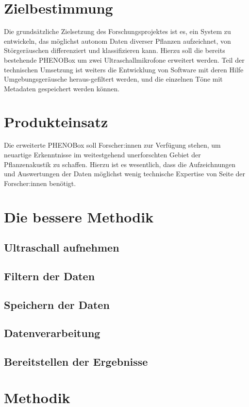 \documentclass[12pt]{article}
\begin{document}
\section{Zielbestimmung}
    Die grundsätzliche Zielsetzung des Forschungsprojektes ist es, ein System zu entwickeln, das möglichst autonom Daten diverser Pflanzen aufzeichnet, von Störgeräuschen differenziert und klassifizieren kann. Hierzu soll die bereits bestehende \Gls{PHENOBox} um zwei Ultraschallmikrofone erweitert werden. Teil der technischen Umsetzung ist weiters die Entwicklung von Software mit deren Hilfe Umgebungsgeräusche heraus-gefiltert werden, und die einzelnen Töne mit \Gls{Metadaten} gespeichert werden können.
\clearpage
    
\section{Produkteinsatz}
    Die erweiterte \Gls{PHENOBox} soll Forscher:innen zur Verfügung stehen, um neuartige Erkenntnisse im weitestgehend unerforschten Gebiet der Pflanzenakustik zu schaffen. Hierzu ist es wesentlich, dass die Aufzeichnungen und Auswertungen der Daten möglichst wenig technische Expertise von Seite der Forscher:innen benötigt. 
 \clearpage

\section{Die bessere Methodik}
    \subsection{Ultraschall aufnehmen} 
    \subsection{Filtern der Daten}
    \subsection{Speichern der Daten}
    \subsection{Datenverarbeitung}
    \subsection{Bereitstellen der Ergebnisse}
 
\section{Methodik}
\end{document}
